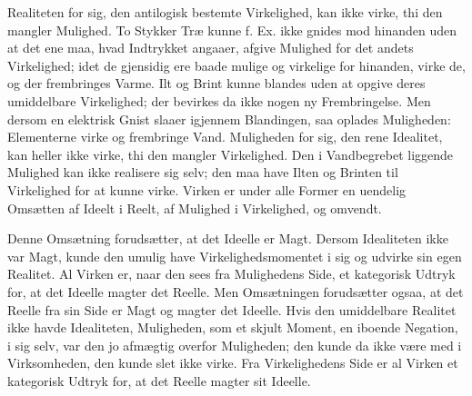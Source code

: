 \documentclass[12pt,a4paper]{book}
\begin{document}
Realiteten for sig, den antilogisk bestemte Virkelighed, kan ikke virke,
thi den mangler Mulighed. To Stykker Træ kunne f. Ex. ikke gnides mod
hinanden uden at det ene maa, hvad Indtrykket angaaer, afgive Mulighed for
det andets Virkelighed; idet de gjensidig ere baade mulige og virkelige
for hinanden, virke de, og der frembringes Varme. Ilt og Brint kunne
blandes uden at opgive deres umiddelbare Virkelighed; der bevirkes da ikke
nogen ny Frembringelse. Men dersom en elektrisk Gnist slaaer igjennem
Blandingen, saa oplades Muligheden: Elementerne virke og frembringe Vand.
Muligheden for sig, den rene Idealitet, kan heller ikke virke, thi den
mangler Virkelighed. Den i Vandbegrebet liggende Mulighed kan ikke
realisere sig selv; den maa have Ilten og Brinten til Virkelighed for at
kunne virke. Virken er under alle Former en uendelig Omsætten af Ideelt i
Reelt, af Mulighed i Virkelighed, og omvendt.

Denne Omsætning forudsætter, at det Ideelle er Magt. Dersom Idealiteten
ikke var Magt, kunde den umulig have Virkelighedsmomentet i sig og udvirke
sin egen Realitet. Al Virken er, naar den sees fra Mulighedens Side, et
kategorisk Udtryk for, at det Ideelle magter det Reelle. Men Omsætningen
forudsætter ogsaa, at det Reelle fra sin Side er Magt og magter det
Ideelle. Hvis den umiddelbare Realitet ikke havde Idealiteten, Muligheden,
som et skjult Moment, en iboende Negation, i sig selv, var den jo
afmægtig overfor Muligheden; den kunde da ikke være med i Virksomheden,
den kunde slet ikke virke. Fra Virkelighedens
Side er al Virken et kategorisk Udtryk for, at det Reelle magter sit
Ideelle.
\end{document}
